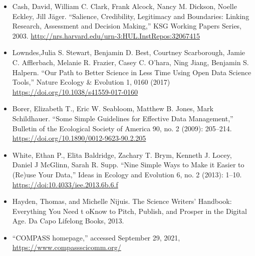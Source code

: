 \documentclass[
]{book}
\providecommand{\tightlist}{%
  \setlength{\itemsep}{0pt}\setlength{\parskip}{0pt}}
\begin{document}
\begin{itemize}
\tightlist
\item
  Cash, David, William C. Clark, Frank Alcock, Nancy M. Dickson, Noelle Eckley, Jill Jäger. ``Salience, Credibility, Legitimacy and Boundaries: Linking Research, Assessment and Decision Making,'' KSG Working Papers Series, 2003. \url{http://nrs.harvard.edu/urn-3:HUL.InstRepos:32067415}
\item
  Lowndes,Julia S. Stewart, Benjamin D. Best, Courtney Scarborough, Jamie C. Afflerbach, Melanie R. Frazier, Casey C. O'hara, Ning Jiang, Benjamin S. Halpern. ``Our Path to Better Science in Less Time Using Open Data Science Tools,'' Nature Ecology \& Evolution 1, 0160 (2017) \url{https://doi.org/10.1038/s41559-017-0160}
\item
  Borer, Elizabeth T., Eric W. Seabloom, Matthew B. Jones, Mark Schildhauer. ``Some Simple Guidelines for Effective Data Management,'' Bulletin of the Ecological Society of America 90, no. 2 (2009): 205--214. \url{https://doi.org/10.1890/0012-9623-90.2.205}
\item
  White, Ethan P., Elita Baldridge, Zachary T. Brym, Kenneth J. Locey, Daniel J McGlinn, Sarah R. Supp. ``Nine Simple Ways to Make it Easier to (Re)use Your Data,'' Ideas in Ecology and Evolution 6, no. 2 (2013): 1--10. \url{https://doi:10.4033/iee.2013.6b.6.f}
\item
  Hayden, Thomas, and Michelle Nijuis. The Science Writers' Handbook: Everything You Need t oKnow to Pitch, Publish, and Prosper in the Digital Age. Da Capo Lifelong Books, 2013.
\item
  ``COMPASS homepage,'' accessed September 29, 2021, \url{https://www.compassscicomm.org/}
\end{itemize}
\end{document}
